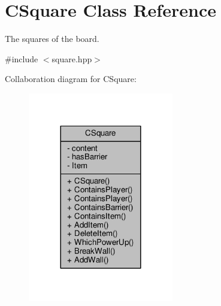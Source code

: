 \hypertarget{class_c_square}{\section{C\-Square Class Reference}
\label{class_c_square}
}


The squares of the board.  




{\ttfamily \#include $<$square.\-hpp$>$}



Collaboration diagram for C\-Square\-:
\nopagebreak
\begin{figure}[H]
\begin{center}
\leavevmode
\includegraphics[width=180pt]{class_c_square__coll__graph}
\end{center}
\end{figure}
